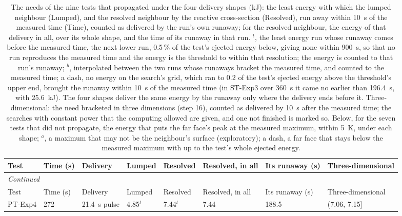 {\scriptsize\setlength{\tabcolsep}{3pt}
\begin{longtable}{p{}p{}p{}p{}p{}p{}p{}p{}}
\caption{The needs of the nine tests that propagated under the four delivery shapes (kJ): the least energy with which the lumped neighbour (Lumped), and the resolved neighbour by the reactive cross-section (Resolved), run away within 10~s of the measured time (Time), counted as delivered by the run's own runaway; for the resolved neighbour, the energy of that delivery in all, over its whole shape, and the time of its runaway in that run. $^{t}$, the least energy run whose runaway comes before the measured time, the next lower run, 0.5\,\% of the test's ejected energy below, giving none within 900~s, so that no run reproduces the measured time and the energy is the threshold to within that resolution; the energy is counted to that run's runaway; $^{b}$, interpolated between the two runs whose runaways bracket the measured time, and counted to the measured time; a dash, no energy on the search's grid, which ran to 0.2 of the test's ejected energy above the threshold's upper end, brought the runaway within 10~s of the measured time (in ST-Exp3 over 360~s it came no earlier than 196.4~s, with 25.6~kJ). The four shapes deliver the same energy by the runaway only where the delivery ends before it. Three-dimensional: the need bracketed in three dimensions (step 16), counted as delivered by 10~s after the measured time; the searches with constant power that the computing allowed are given, and one not finished is marked so. Below, for the seven tests that did not propagate, the energy that puts the far face's peak at the measured maximum, within 5~K, under each shape; $^{a}$, a maximum that may not be the neighbour's surface (exploratory); a dash, a far face that stays below the measured maximum with up to the test's whole ejected energy.}\label{tab:s-needs}\\
\toprule
Test & Time (s) & Delivery & Lumped & Resolved & Resolved, in all & Its runaway (s) & Three-dimensional \\
\midrule
\endfirsthead
\multicolumn{8}{l}{\textit{Continued}} \\
\toprule
Test & Time (s) & Delivery & Lumped & Resolved & Resolved, in all & Its runaway (s) & Three-dimensional \\
\midrule
\endhead
PT-Exp4 & 272 & 21.4~s pulse & 4.85$^{t}$ & 7.44$^{t}$ & 7.44 & 188.5 & (7.06, 7.15] \\

\end{longtable}}
